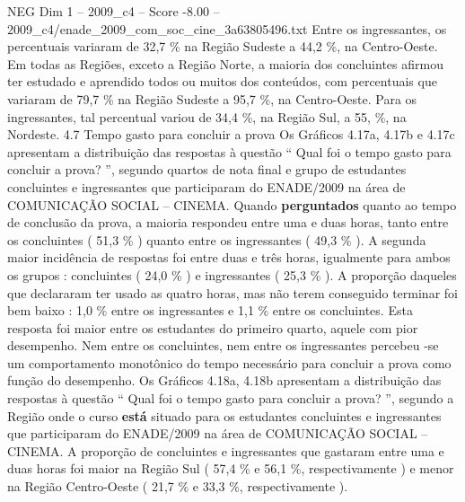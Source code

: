 \begin{textsample}{NEG Dim 1 – 2009\_c4 – Score -8.00 – 2009\_c4/enade\_2009\_com\_soc\_cine\_3a63805496.txt}
Entre os ingressantes, os percentuais variaram de 32,7 \% na Região Sudeste a 44,2 \%, na Centro-Oeste.
Em todas as Regiões, exceto a Região Norte, a maioria dos concluintes afirmou ter estudado e aprendido todos ou muitos dos conteúdos, com percentuais que variaram de 79,7 \% na Região Sudeste a 95,7 \%, na Centro-Oeste.
Para os ingressantes, tal percentual variou de 34,4 \%, na Região Sul, a 55, \%, na Nordeste. 4.7 Tempo gasto para concluir a prova Os Gráficos 4.17a, 4.17b e 4.17c apresentam a distribuição das respostas à questão “ Qual foi o tempo gasto para concluir a prova? ”, segundo quartos de nota final e grupo de estudantes concluintes e ingressantes que participaram do ENADE/2009 na área de COMUNICAÇÃO SOCIAL – CINEMA.
Quando \textbf{perguntados} quanto ao tempo de conclusão da prova, a maioria respondeu entre uma e duas horas, tanto entre os concluintes ( 51,3 \% ) quanto entre os ingressantes ( 49,3 \% ).
A segunda maior incidência de respostas foi entre duas e três horas, igualmente para ambos os grupos : concluintes ( 24,0 \% ) e ingressantes ( 25,3 \% ).
A proporção daqueles que declararam ter usado as quatro horas, mas não terem conseguido terminar foi bem baixo : 1,0 \% entre os ingressantes e 1,1 \% entre os concluintes.
Esta resposta foi maior entre os estudantes do primeiro quarto, aquele com pior desempenho.
Nem entre os concluintes, nem entre os ingressantes percebeu -se um comportamento monotônico do tempo necessário para concluir a prova como função do desempenho.
Os Gráficos 4.18a, 4.18b apresentam a distribuição das respostas à questão “ Qual foi o tempo gasto para concluir a prova? ”, segundo a Região onde o curso \textbf{está} situado para os estudantes concluintes e ingressantes que participaram do ENADE/2009 na área de COMUNICAÇÃO SOCIAL – CINEMA.
A proporção de concluintes e ingressantes que gastaram entre uma e duas horas foi maior na Região Sul ( 57,4 \% e 56,1 \%, respectivamente ) e menor na Região Centro-Oeste ( 21,7 \% e 33,3 \%, respectivamente ).

\end{textsample}
